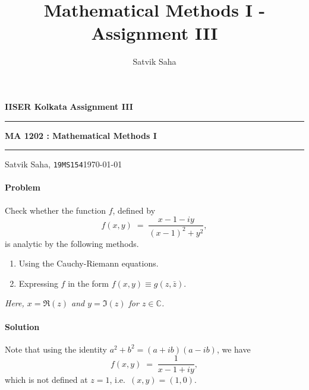 \documentclass[10pt]{article}
\title{Mathematical Methods I - Assignment III}
\author{Satvik Saha}
\date{}
\newcounter{prob}
\def\problem{\stepcounter{prob}\paragraph{Problem \arabic{prob}}}
\def\solution{\paragraph{Solution}}
\begin{document}
        \par\textbf{IISER Kolkata} \hfill \textbf{Assignment III}
        \vspace{3pt}
        \hrule
        \vspace{3pt}
        \begin{center}
                \LARGE{\textbf{MA 1202 : Mathematical Methods I}}
        \end{center}
        \vspace{3pt}
        \hrule
        \vspace{3pt}
        Satvik Saha, \texttt{19MS154}\hfill\today
        \vspace{20pt}

        \problem Check whether the function $f$, defined by 
        \[
                f(x, y) \;=\; \frac{x - 1 - iy}{(x - 1)^2 + y^2},
        \]
        is analytic by the following methods.
        \begin{enumerate}
                \item Using the Cauchy-Riemann equations.
                \item Expressing $f$ in the form $f(x, y) \equiv g(z, \bar{z})$.
        \end{enumerate}
        \textit{Here, $x = \Re(z)$ and $y = \Im(z)$ for $z \in \mathbb{C}$.} 
        \solution Note that using the identity $a^2 + b^2 = (a + ib)(a - ib)$, we have
        \[
        f(x, y) \;=\; \frac{1}{x - 1 + iy},
        \]
        which is not defined at $z = 1$, i.e.\ $(x, y) = (1, 0)$.
\end{document}

